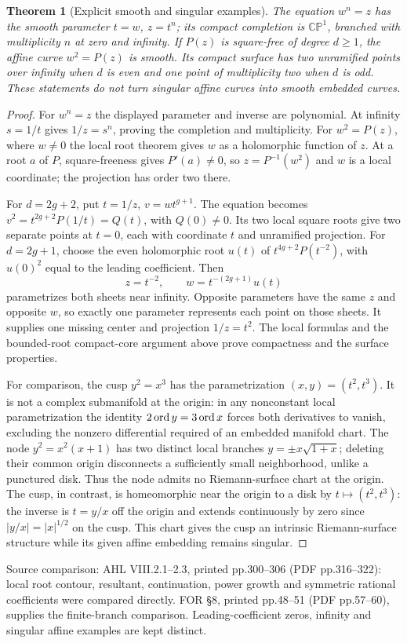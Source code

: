 \documentclass[11pt,a4paper,openany]{book}
\newtheorem{theorem}{Theorem}[chapter]
\theoremstyle{definition}
\theoremstyle{remark}\newtheorem{remark}[theorem]{Remark}
\newcommand{\family}[1]{}
\newcommand{\source}[1]{\par\begingroup\small\sffamily\color{black!65}Source comparison: #1\par\endgroup}
\begin{document}
\begin{theorem}[Explicit smooth and singular examples]\label{d12:21-07}\family{D12.21.07}
The equation $w^n=z$ has the smooth parameter $t=w$, $z=t^n$; its compact
completion is $\mathbb{CP}^1$, branched with multiplicity $n$ at zero
and infinity. If $P(z)$ is square-free of degree $d\ge1$, the affine
curve $w^2=P(z)$ is smooth. Its compact surface has two unramified
points over infinity when $d$ is even and one point of multiplicity two
when $d$ is odd. These statements do not turn singular affine curves
into smooth embedded curves.
\end{theorem}
\begin{proof}
For $w^n=z$ the displayed parameter and inverse are polynomial. At
infinity $s=1/t$ gives $1/z=s^n$, proving the completion and multiplicity.
For $w^2=P(z)$, where $w\ne0$ the local root theorem gives $w$ as a
holomorphic function of $z$. At a root $a$ of $P$, square-freeness gives
$P'(a)\ne0$, so $z=P^{-1}(w^2)$ and $w$ is a local coordinate; the
projection has order two there.

For $d=2g+2$, put $t=1/z$, $v=wt^{g+1}$. The equation becomes
$v^2=t^{2g+2}P(1/t)=Q(t)$, with $Q(0)\ne0$. Its two local square
roots give two separate points at $t=0$, each with coordinate $t$ and
unramified projection. For $d=2g+1$, choose the even holomorphic root
$u(t)$ of $t^{4g+2}P(t^{-2})$, with $u(0)^2$ equal to the leading
coefficient. Then
\[
                  z=t^{-2},\qquad w=t^{-(2g+1)}u(t)
\]
parametrizes both sheets near infinity. Opposite parameters have the
same $z$ and opposite $w$, so exactly one parameter represents each
point on those sheets. It supplies one missing center and projection
$1/z=t^2$. The local formulas and the bounded-root compact-core
argument above prove compactness and the surface properties.

For comparison, the cusp $y^2=x^3$ has the parametrization
$(x,y)=(t^2,t^3)$. It is not a complex submanifold at the origin:
in any nonconstant local parametrization the identity
$2\operatorname{ord} y=3\operatorname{ord} x$ forces both derivatives to vanish, excluding the
nonzero differential required of an embedded manifold chart. The node
$y^2=x^2(x+1)$ has two distinct local branches
$y=\pm x\sqrt{1+x}$; deleting their common origin disconnects a
sufficiently small neighborhood, unlike a punctured disk. Thus the
node admits no Riemann-surface chart at the origin. The cusp, in
contrast, is homeomorphic near the origin to a disk by $t\mapsto(t^2,t^3)$:
the inverse is $t=y/x$ off the origin and extends continuously by zero
since $|y/x|=|x|^{1/2}$ on the cusp. This chart gives the cusp an
intrinsic Riemann-surface structure while its given affine embedding
remains singular.
\end{proof}
\source{AHL VIII.2.1--2.3, printed pp.300--306 (PDF pp.316--322):
local root contour, resultant, continuation, power growth and symmetric
rational coefficients were compared directly. FOR \S8, printed
pp.48--51 (PDF pp.57--60), supplies the finite-branch comparison.
Leading-coefficient zeros, infinity and singular affine examples are
kept distinct.}
\end{document}

